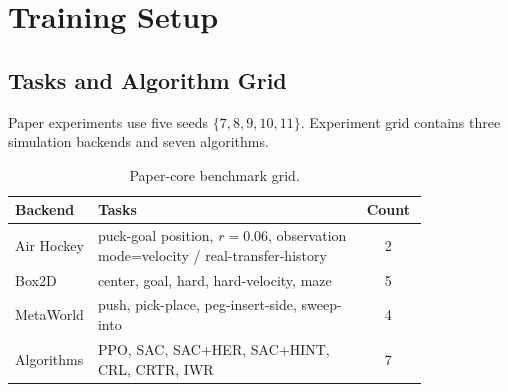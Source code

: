 \section{Training Setup}
\label{app:training_setup}


\subsection{Tasks and Algorithm Grid}

Paper experiments use five seeds $\{7,8,9,10,11\}$.
Experiment grid contains three simulation backends and seven algorithms.

\begin{table}[h]
\centering
\small
\setlength{\tabcolsep}{5pt}
\caption{Paper-core benchmark grid.}
\label{tab:appendix-paper-core-grid}
\begin{tabular}{p{0.18\linewidth}p{0.64\linewidth}c}
\toprule
Backend & Tasks & Count \\
\midrule
Air Hockey & puck-goal position, $r=0.06$, observation mode=velocity / real-transfer-history & 2 \\
Box2D & center, goal, hard, hard-velocity, maze & 5 \\
MetaWorld & push, pick-place, peg-insert-side, sweep-into & 4 \\
\midrule
Algorithms & PPO, SAC, SAC+HER, SAC+HINT, CRL, CRTR, IWR & 7 \\
\bottomrule
\end{tabular}
\end{table}



